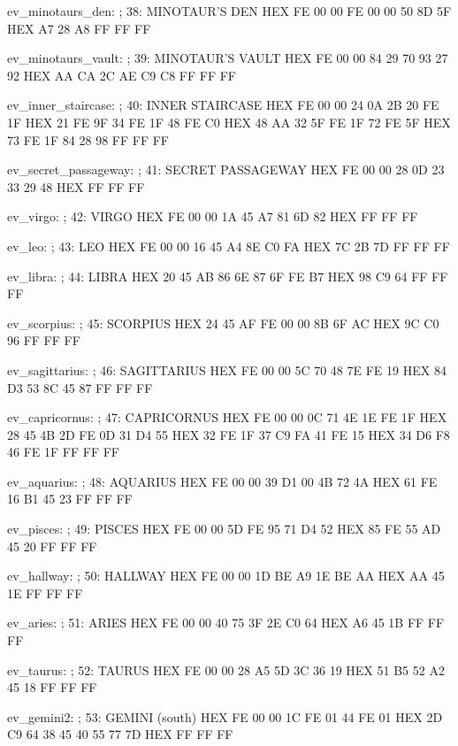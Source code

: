 \documentclass[10pt]{report}
\begin{document}
ev_minotaurs_den:                       ; 38: MINOTAUR'S DEN
    HEX FE 00 00 FE 00 00 50 8D 5F
    HEX A7 28 A8 FF FF FF

ev_minotaurs_vault:                     ; 39: MINOTAUR'S VAULT
    HEX FE 00 00 84 29 70 93 27 92
    HEX AA CA 2C AE C9 C8 FF FF FF

ev_inner_staircase:                     ; 40: INNER STAIRCASE
    HEX FE 00 00 24 0A 2B 20 FE 1F
    HEX 21 FE 9F 34 FE 1F 48 FE C0
    HEX 48 AA 32 5F FE 1F 72 FE 5F
    HEX 73 FE 1F 84 28 98 FF FF FF

ev_secret_passageway:                   ; 41: SECRET PASSAGEWAY
    HEX FE 00 00 28 0D 23 33 29 48
    HEX FF FF FF

ev_virgo:                               ; 42: VIRGO
    HEX FE 00 00 1A 45 A7 81 6D 82
    HEX FF FF FF

ev_leo:                                 ; 43: LEO
    HEX FE 00 00 16 45 A4 8E C0 FA
    HEX 7C 2B 7D FF FF FF

ev_libra:                               ; 44: LIBRA
    HEX 20 45 AB 86 6E 87 6F FE B7
    HEX 98 C9 64 FF FF FF

ev_scorpius:                            ; 45: SCORPIUS
    HEX 24 45 AF FE 00 00 8B 6F AC
    HEX 9C C0 96 FF FF FF

ev_sagittarius:                         ; 46: SAGITTARIUS
    HEX FE 00 00 5C 70 48 7E FE 19
    HEX 84 D3 53 8C 45 87 FF FF FF

ev_capricornus:                         ; 47: CAPRICORNUS
    HEX FE 00 00 0C 71 4E 1E FE 1F
    HEX 28 45 4B 2D FE 0D 31 D4 55
    HEX 32 FE 1F 37 C9 FA 41 FE 15
    HEX 34 D6 F8 46 FE 1F FF FF FF

ev_aquarius:                            ; 48: AQUARIUS
    HEX FE 00 00 39 D1 00 4B 72 4A
    HEX 61 FE 16 B1 45 23 FF FF FF

ev_pisces:                              ; 49: PISCES
    HEX FE 00 00 5D FE 95 71 D4 52
    HEX 85 FE 55 AD 45 20 FF FF FF

ev_hallway:                             ; 50: HALLWAY
    HEX FE 00 00 1D BE A9 1E BE AA
    HEX AA 45 1E FF FF FF

ev_aries:                               ; 51: ARIES
    HEX FE 00 00 40 75 3F 2E C0 64
    HEX A6 45 1B FF FF FF

ev_taurus:                              ; 52: TAURUS
    HEX FE 00 00 28 A5 5D 3C 36 19
    HEX 51 B5 52 A2 45 18 FF FF FF

ev_gemini2:                             ; 53: GEMINI (south)
    HEX FE 00 00 1C FE 01 44 FE 01
    HEX 2D C9 64 38 45 40 55 77 7D
    HEX FF FF FF
\end{document}
